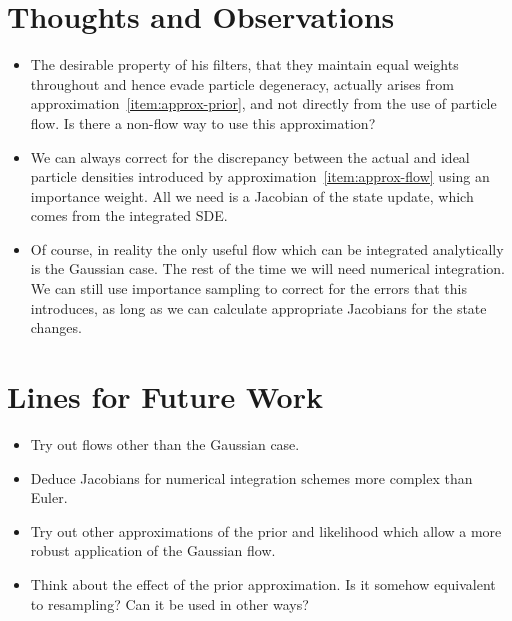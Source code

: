 \documentclass{article}
\begin{document}
\section{Thoughts and Observations}

\begin{itemize}
  \item The desirable property of his filters, that they maintain equal weights throughout and hence evade particle degeneracy, actually arises from approximation~\ref{item:approx-prior}, and not directly from the use of particle flow. Is there a non-flow way to use this approximation?
  \item We can always correct for the discrepancy between the actual and ideal particle densities introduced by approximation~\ref{item:approx-flow} using an importance weight. All we need is a Jacobian of the state update, which comes from the integrated SDE.
  \item Of course, in reality the only useful flow which can be integrated analytically is the Gaussian case. The rest of the time we will need numerical integration. We can still use importance sampling to correct for the errors that this introduces, as long as we can calculate appropriate Jacobians for the state changes.
\end{itemize}

\section{Lines for Future Work}

\begin{itemize}
  \item Try out flows other than the Gaussian case.
  \item Deduce Jacobians for numerical integration schemes more complex than Euler.
  \item Try out other approximations of the prior and likelihood which allow a more robust application of the Gaussian flow.
  \item Think about the effect of the prior approximation. Is it somehow equivalent to resampling? Can it be used in other ways?
\end{itemize}
\end{document}
